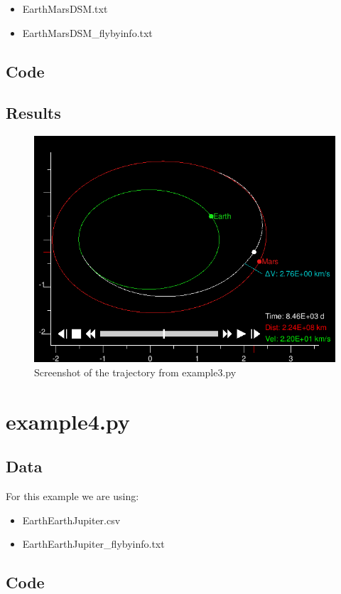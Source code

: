 \documentclass[a4paper,11pt]{article}
\begin{document}
\begin{itemize}
\item EarthMarsDSM.txt
\item EarthMarsDSM\_flybyinfo.txt
\end{itemize}
\subsection{Code}

\subsection{Results}
\begin{figure}[h!]
\centering
\includegraphics[width=1\textwidth]{img/example3}
\caption{Screenshot of the trajectory from example3.py}
\label{img:example3}
\end{figure}


\section{example4.py}
\subsection{Data}
For this example we are using:

\begin{itemize}
\item EarthEarthJupiter.csv
\item EarthEarthJupiter\_flybyinfo.txt
\end{itemize}
\subsection{Code}

\end{document}
